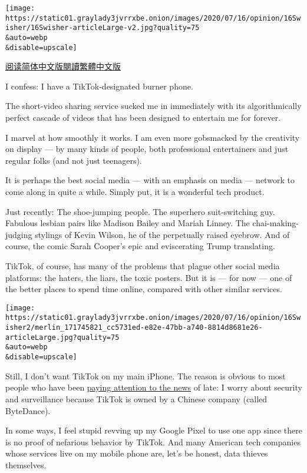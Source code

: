 \texttt{[image: https://static01.graylady3jvrrxbe.onion/images/2020/07/16/opinion/16Swisher/16Swisher-articleLarge-v2.jpg?quality=75\\\&auto=webp\\\&disable=upscale]}

\href{https://cn.nytimes3xbfgragh.onion/opinion/20200720/tiktok-ban-china/}{阅读简体中文版}\href{https://cn.nytimes3xbfgragh.onion/opinion/20200720/tiktok-ban-china/zh-hant/}{閱讀繁體中文版}

I confess: I have a TikTok-designated burner phone.

The short-video sharing service sucked me in immediately with its
algorithmically perfect cascade of videos that has been designed to
entertain me for forever.

I marvel at how smoothly it works. I am even more gobsmacked by the
creativity on display --- by many kinds of people, both professional
entertainers and just regular folks (and not just teenagers).

It is perhaps the best social media --- with an emphasis on media ---
network to come along in quite a while. Simply put, it is a wonderful
tech product.

Just recently: The shoe-jumping people. The superhero suit-switching
guy. Fabulous lesbian pairs like Madison Bailey and Mariah Linney. The
chai-making-judging stylings of Kevin Wilson, he of the perpetually
raised eyebrow. And of course, the comic Sarah Cooper's epic and
eviscerating Trump translating.

TikTok, of course, has many of the problems that plague other social
media platforms: the haters, the liars, the toxic posters. But it is ---
for now --- one of the better places to spend time online, compared with
other similar services.

\texttt{[image: https://static01.graylady3jvrrxbe.onion/images/2020/07/16/opinion/16Swisher2/merlin\_171745821\_cc5731ed-e82e-47bb-a740-8814d8681e26-articleLarge.jpg?quality=75\\\&auto=webp\\\&disable=upscale]}

Still, I don't want TikTok on my main iPhone. The reason is obvious to
most people who have been
\href{https://www.nytimes3xbfgragh.onion/2020/07/15/technology/tiktok-washington-lobbyist.html}{paying
attention to the news} of late: I worry about security and surveillance
because TikTok is owned by a Chinese company (called ByteDance).

In some ways, I feel stupid revving up my Google Pixel to use one app
since there is no proof of nefarious behavior by TikTok. And many
American tech companies whose services live on my mobile phone are,
let's be honest, data thieves themselves.

